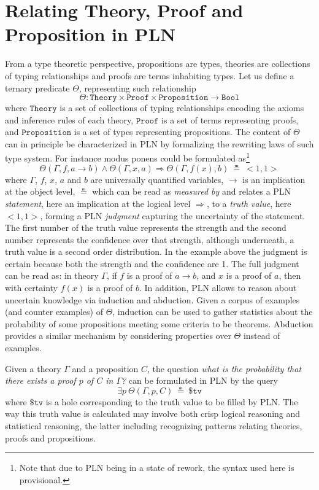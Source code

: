 \documentclass{easychair}
\newcommand{\U}{\Theta}
\newcommand{\Theory}{\texttt{Theory}}
\newcommand{\Proof}{\texttt{Proof}}
\newcommand{\Proposition}{\texttt{Proposition}}
\newcommand{\Bool}{\texttt{Bool}}
\newcommand{\arrow}{\to}
\newcommand{\limp}{\Rightarrow}
\newcommand{\STV}[2]{<\!#1, #2\!>}
\begin{document}
\section{Relating Theory, Proof and Proposition in PLN}

From a type theoretic perspective, propositions are types, theories
are collections of typing relationships and proofs are terms
inhabiting types.  Let us define a ternary predicate $\U$,
representing such relationship
$$\U : \Theory \times \Proof \times \Proposition \arrow \Bool$$ where
$\Theory$ is a set of collections of typing relationships encoding the
axioms and inference rules of each theory, $\Proof$ is a set of terms
representing proofs, and $\Proposition$ is a set of types representing
propositions.  The content of $\U$ can in principle be characterized
in PLN by formalizing the rewriting laws of such type system.  For
instance modus ponens could be formulated as\footnote{Note that due to
PLN being in a state of rework, the syntax used here is provisional.}
$$\U(\Gamma, f, a \to b) \land \U(\Gamma, x, a) \limp \U(\Gamma, f(x),
b)\ \measeq\ \STV{1}{1}$$ where $\Gamma$, $f$, $x$, $a$ and $b$ are
universally quantified variables, $\to$ is an implication at the
object level, $\measeq$ which can be read as \emph{measured by} and
relates a PLN \emph{statement}, here an implication at the logical
level $\limp$, to a \emph{truth value}, here $\STV{1}{1}$, forming a
PLN \emph{judgment} capturing the uncertainty of the statement.  The
first number of the truth value represents the strength and the second
number represents the confidence over that strength, although
underneath, a truth value is a second order distribution.  In the
example above the judgment is certain because both the strength and
the confidence are 1.  The full judgment can be read as: in theory
$\Gamma$, if $f$ is a proof of $a \arrow b$, and $x$ is a proof of
$a$, then with certainty $f(x)$ is a proof of $b$.  In addition, PLN
allows to reason about uncertain knowledge via induction and
abduction.  Given a corpus of examples (and counter examples) of
$\Theta$, induction can be used to gather statistics about the
probability of some propositions meeting some criteria to be theorems.
Abduction provides a similar mechanism by considering properties over
$\Theta$ instead of examples.

Given a theory $\Gamma$ and a proposition $C$, the question \emph{what
is the probability that there exists a proof $p$ of $C$ in $\Gamma$?}
can be formulated in PLN by the query
$$\exists p\ \U(\Gamma, p, C)\ \measeq\ \$\texttt{tv}$$ where
$\$\texttt{tv}$ is a hole corresponding to the truth value to be
filled by PLN.  The way this truth value is calculated may involve
both crisp logical reasoning and statistical reasoning, the latter
including recognizing patterns relating theories, proofs and
propositions.
\end{document}
